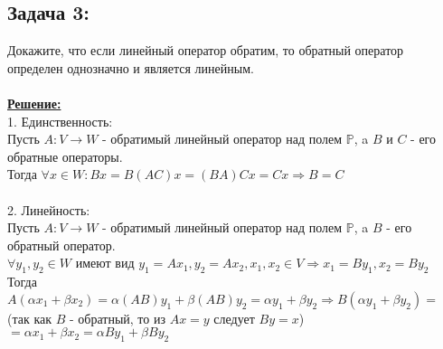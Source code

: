 \documentclass[a4paper,12pt,titlepage,final]{article}
\begin{document}
\subsection*{Задача 3:}
\noindent Докажите, что если линейный оператор обратим, то обратный оператор определен однозначно и является линейным. \\ \\
\textbf{\underline{Решение:}} \\
1. Единственность: \\
Пусть $A: V \rightarrow W$ - обратимый линейный оператор над полем $\mathbb{P}$, a $B$ и $C$ - его обратные операторы.\\
Тогда $\forall x \in W: Bx = B(AC)x = (BA)Cx = Cx \Rightarrow B = C$ \\ \\
2. Линейность: \\
Пусть $A: V \rightarrow W$ - обратимый линейный оператор над полем $\mathbb{P}$, a $B$ - его обратный оператор.\\
$\forall y_1, y_2 \in W$ имеют вид $ y_1 = Ax_1, y_2 = Ax_2, x_1, x_2 \in V \Rightarrow x_1 = By_1, x_2 = By_2$ \\
Тогда $A(\alpha x_1 + \beta x_2) = \alpha (AB)y_1 + \beta (AB)y_2 = \alpha y_1 + \beta y_2 \Rightarrow B(\alpha y_1 + \beta y_2) =$
(так как $B$ - обратный, то из $Ax = y$ следует $By = x$) $= \alpha x_1 + \beta x_2 = \alpha By_1 + \beta By_2$ \\ \\ \\


\end{document}
